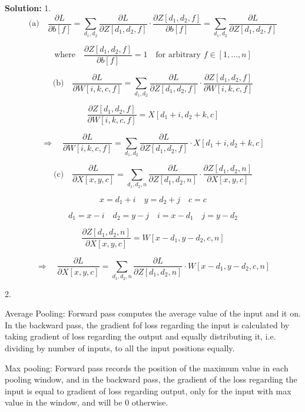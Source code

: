 \documentclass{article}
\newenvironment{solution}{\color{blue} \smallskip \textbf{Solution:}}{}
\begin{document}
\begin{solution}
1.
   \[
\text{(a)} \quad \frac{\partial L}{\partial b[f]} = \sum_{d_1, d_2} \frac{\partial L}{\partial Z[d_1, d_2, f]} \cdot \frac{\partial Z[d_1, d_2, f]}{\partial b[f]} = \sum_{d_1, d_2} \frac{\partial L}{\partial Z[d_1, d_2, f]}
\]

\[
\text{where} \quad \frac{\partial Z[d_1, d_2, f]}{\partial b[f]} = 1 \quad \text{for arbitrary } f \in [1, \dots, n]
\]
    
    
\[
\text{(b)} \quad \frac{\partial L}{\partial W[i, k, c, f]} = \sum_{d_1, d_2} \frac{\partial L}{\partial Z[d_1, d_2, f]} \cdot \frac{\partial Z[d_1, d_2, f]}{\partial W[i, k, c, f]}
\]

\[
\frac{\partial Z[d_1, d_2, f]}{\partial W[i, k, c, f]} = X[d_1 + i, d_2 + k, c]
\]

\[
\Rightarrow \quad \frac{\partial L}{\partial W[i, k, c, f]} = \sum_{d_1, d_2} \frac{\partial L}{\partial Z[d_1, d_2, f]} \cdot X[d_1 + i, d_2 + k, c]
\]
    
 \[
\text{(c)} \quad \frac{\partial L}{\partial X[x, y, c]} = \sum_{d_1, d_2, n} \frac{\partial L}{\partial Z[d_1, d_2, n]} \cdot \frac{\partial Z[d_1, d_2, n]}{\partial X[x, y, c]}
\]

\[
x = d_1 + i \quad y = d_2 + j \quad c = c
\]

\[
d_1 = x - i \quad d_2 = y - j \quad i = x - d_1 \quad j = y - d_2
\]

\[
\frac{\partial Z[d_1, d_2, n]}{\partial X[x, y, c]} = W[x - d_1, y - d_2, c, n]
\]

\[
\Rightarrow \quad \frac{\partial L}{\partial X[x, y, c]} = \sum_{d_1, d_2, n} \frac{\partial L}{\partial Z[d_1, d_2, n]} \cdot W[x - d_1, y - d_2, c, n]
\]

2.

Average Pooling: Forward pass computes the average value of the input and it on. In the backward pass, the gradient fof loss regarding the input is calculated by taking gradient of loss regarding the output and equally distributing it, i.e. dividing by number of inputs, to all the input positions equally. 

Max pooling: Forward pass records the position of the maximum value in each pooling window, and in the backward pass, the gradient of the loss regarding the input is equal to gradient of loss regarding output, only for the input with max value in the window, and will be 0 otherwise.


\end{solution}
\end{document}
